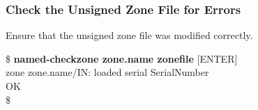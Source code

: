 
\subsubsection{Check the Unsigned Zone File for Errors}

Ensure that the unsigned zone file was modified correctly.
\begin{tabbing}
\hspace{0.5in}\$ {\bf named-checkzone zone.name zonefile} [ENTER] \\
\hspace{0.5in} zone zone.name/IN: loaded serial SerialNumber \\
\hspace{0.5in} OK \\
\hspace{0.5in}\$ \\
\end{tabbing}
